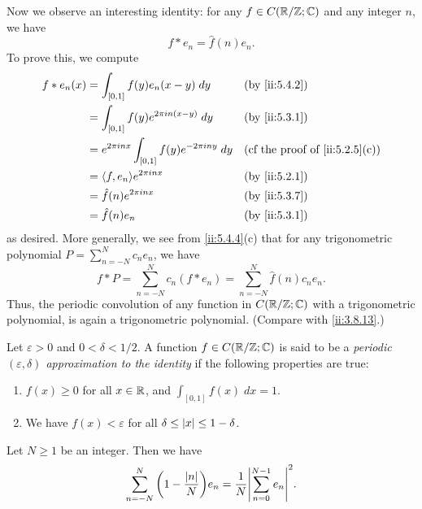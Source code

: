 \begin{ac}\label{ii:ac:5.4.1}
  Now we observe an interesting identity:
  for any \(f \in C(\mathbb{R} / \mathbb{Z} ; \mathbb{C})\) and any integer \(n\), we have
  \[
    f * e_n = \hat{f}(n) e_n.
  \]
  To prove this, we compute
  \begin{align*}
    f * e_n(x) & = \int_{[0, 1]} f(y) e_n(x - y) \; dy                        &  & \by{ii:5.4.2}                               \\
               & = \int_{[0, 1]} f(y) e^{2 \pi i n (x - y)} \; dy             &  & \by{ii:5.3.1}                               \\
               & = e^{2 \pi i n x} \int_{[0, 1]} f(y) e^{- 2 \pi i n y} \; dy &  & \text{(cf the proof of \cref{ii:5.2.5}(c))} \\
               & = \inner*{f, e_n} e^{2 \pi i n x}                            &  & \by{ii:5.2.1}                               \\
               & = \hat{f}(n) e^{2 \pi i n x}                                 &  & \by{ii:5.3.7}                               \\
               & = \hat{f}(n) e_n                                             &  & \by{ii:5.3.1}
  \end{align*}
  as desired.
  More generally, we see from \cref{ii:5.4.4}(c) that for any trigonometric polynomial \(P = \sum_{n = -N}^N c_n e_n\), we have
  \[
    f * P = \sum_{n = -N}^N c_n (f * e_n) = \sum_{n = -N}^N \hat{f}(n) c_n e_n.
  \]
  Thus, the periodic convolution of any function in \(C(\mathbb{R} / \mathbb{Z} ; \mathbb{C})\) with a trigonometric polynomial, is again a trigonometric polynomial.
  (Compare with \cref{ii:3.8.13}.)
\end{ac}

\begin{defn}\label{ii:5.4.5}
  Let \(\varepsilon > 0\) and \(0 < \delta < 1 / 2\).
  A function \(f \in C(\mathbb{R} / \mathbb{Z} ; \mathbb{C})\) is said to be a \emph{periodic \((\varepsilon, \delta)\) approximation to the identity} if the following properties are true:
  \begin{enumerate}
    \item \(f(x) \geq 0\) for all \(x \in \mathbb{R}\), and \(\int_{[0, 1]} f(x) \; dx = 1\).
    \item We have \(f(x) < \varepsilon\) for all \(\delta \leq \left\lvert x\right\rvert \leq 1 - \delta\).
  \end{enumerate}
\end{defn}

\begin{ac}\label{ii:ac:5.4.2}
  Let \(N \geq 1\) be an integer.
  Then we have
  \[
    \sum_{n = -N}^N \bigg(1 - \dfrac{\abs{n}}{N}\bigg) e_n = \dfrac{1}{N} \abs{\sum_{n = 0}^{N - 1} e_n}^2.
  \]
\end{ac}

